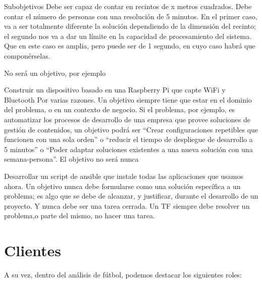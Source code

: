 Subobjetivos
Debe ser capaz de contar en recintos de x metros cuadrados.
Debe contar el número de personas con una resolución de 5 minutos.
En el primer caso, va a ser totalmente diferente la solución 
dependiendo de la dimensión del recinto; el segundo nos va a 
dar un límite en la capacidad de procesamiento del sistema. 
Que en este caso es amplia, pero puede ser de 1 segundo, en 
cuyo caso habrá que componérselas.

No será un objetivo, por ejemplo

Construir un dispositivo basado en una Raspberry Pi que 
capte WiFi y Bluetooth
Por varias razones. Un objetivo siempre tiene que estar 
en el dominio del problema, o en un contexto de negocio. 
Si el problema, por ejemplo, es automatizar los procesos 
de desarrollo de una empresa que provee soluciones de 
gestión de contenidos, un objetivo podrá ser “Crear 
configuraciones repetibles que funcionen con una sola 
orden” o “reducir el tiempo de despliegue de desarrollo 
a 5 minutos” o “Poder adaptar soluciones existentes a 
una nueva solución con una semana-persona”. El objetivo no será nunca

Desarrollar un script de ansible que instale todas las 
aplicaciones que usamos ahora.
Un objetivo nunca debe formularse como una solución 
específica a un problema; es algo que se debe de 
alcanzar, y justificar, durante el desarrollo de 
un proyecto. Y nunca debe ser una tarea cerrada. 
Un TF siempre debe resolver un problema,o parte del mismo, no hacer una tarea.

\section{Clientes}
A su vez, dentro del análisis de fútbol, podemos destacar los siguientes roles:

